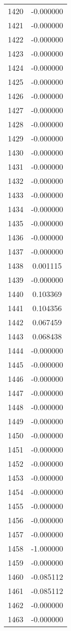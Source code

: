 \documentclass[12pt]{article}
\begin{document}
\begin{longtable}{@{}cc@{}}
1420 & -0.000000 \\
1421 & -0.000000 \\
1422 & -0.000000 \\
1423 & -0.000000 \\
1424 & -0.000000 \\
1425 & -0.000000 \\
1426 & -0.000000 \\
1427 & -0.000000 \\
1428 & -0.000000 \\
1429 & -0.000000 \\
1430 & -0.000000 \\
1431 & -0.000000 \\
1432 & -0.000000 \\
1433 & -0.000000 \\
1434 & -0.000000 \\
1435 & -0.000000 \\
1436 & -0.000000 \\
1437 & -0.000000 \\
1438 & 0.001115 \\
1439 & -0.000000 \\
1440 & 0.103369 \\
1441 & 0.104356 \\
1442 & 0.067459 \\
1443 & 0.068438 \\
1444 & -0.000000 \\
1445 & -0.000000 \\
1446 & -0.000000 \\
1447 & -0.000000 \\
1448 & -0.000000 \\
1449 & -0.000000 \\
1450 & -0.000000 \\
1451 & -0.000000 \\
1452 & -0.000000 \\
1453 & -0.000000 \\
1454 & -0.000000 \\
1455 & -0.000000 \\
1456 & -0.000000 \\
1457 & -0.000000 \\
1458 & -1.000000 \\
1459 & -0.000000 \\
1460 & -0.085112 \\
1461 & -0.085112 \\
1462 & -0.000000 \\
1463 & -0.000000 \\

\end{longtable}
\end{document}
